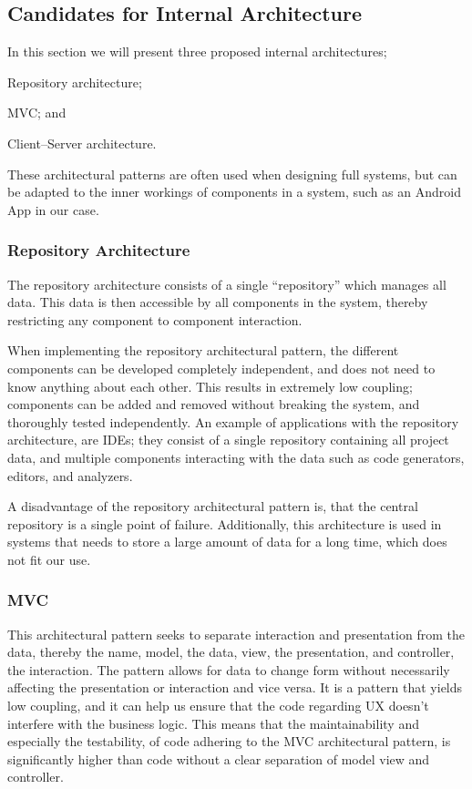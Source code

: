 \subsection{Candidates for Internal Architecture}
In this section we will present three proposed internal architectures;
\begin{eletterate*}
    \item Repository architecture;
    \item \ac{MVC}; and
    \item Client--Server architecture.
\end{eletterate*}
These architectural patterns are often used when designing full systems, but can be adapted to the inner workings of components in a system, such as an Android App in our case.

\subsubsection{Repository Architecture}
The repository architecture consists of a single \enquote{repository} which manages all data.
This data is then accessible by all components in the system, thereby restricting any component to component interaction.

When implementing the repository architectural pattern, the different components can be developed completely independent, and does not need to know anything about each other.
This results in extremely low coupling; components can be added and removed without breaking the system, and thoroughly tested independently.
An example of applications with the repository architecture, are IDEs; they consist of a single repository containing all project data, and multiple components interacting with the data such as code generators, editors, and analyzers.

A disadvantage of the repository architectural pattern is, that the central repository is a single point of failure.
Additionally, this architecture is used in systems that needs to store a large amount of data for a long time, which does not fit our use.

\subsubsection{\acl{MVC}}
This architectural pattern seeks to separate interaction and presentation from the data, thereby the name, model, the data, view, the presentation, and controller, the interaction.
The pattern allows for data to change form without necessarily affecting the presentation or interaction and vice versa.
It is a pattern that yields low coupling, and it can help us ensure that the code regarding \ac{UX} doesn't interfere with the business logic.
This means that the maintainability and especially the testability, of code adhering to the \ac{MVC} architectural pattern, is significantly higher than code without a clear separation of model view and controller.

